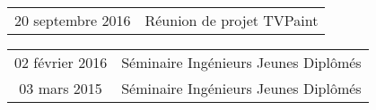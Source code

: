 \documentclass[]{deedy-resume-openfont}
\begin{document}
\descript{}
\begin{tabular}{cp{150mm}}
20 septembre 2016      & Réunion de projet TVPaint\\
\end{tabular}
\sectionsep

\descript{}
\begin{tabular}{cl}
02 février 2016        & Séminaire Ingénieurs Jeunes Diplômés\\
03 mars 2015           & Séminaire Ingénieurs Jeunes Diplômés\\
\end{tabular}
\sectionsep






\hfill
\end{document}
